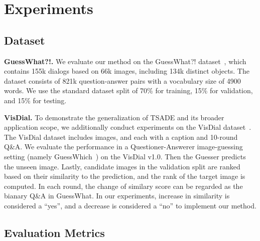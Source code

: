 

\section{Experiments}


\subsection{Dataset}

\textbf{GuessWhat?!.} We evaluate our method on the GuessWhat?! dataset~\cite{de2017guesswhat}, which contains 155k dialogs based on 66k images, including 134k distinct objects. The dataset consists of 821k question-answer pairs with a vocabulary size of 4900 words. We use the standard dataset split of 70\% for training, 15\% for validation, and 15\% for testing.

\textbf{VisDial.} To demonstrate the generalization of TSADE and its broader application scope, we additionally conduct experiments on the VisDial dataset~\cite{2017Visual}.
The VisDial dataset includes images, and each with a caption and 10-round Q\&A. We evaluate the performance in a Questioner-Answerer image-guessing setting (namely GuessWhich~\cite{das2017learning})  on the VisDial v1.0.
Then the Guesser predicts the unseen image. 
Lastly, candidate images in the validation split are ranked based on their similarity to the prediction, and the rank of the target image is computed.
In each round, the change of similary score can be regarded as the bianary Q\&A in GuessWhat. In our experiments, increase in similarity is considered a ``yes'', and a decrease is considered a ``no'' to implement our method.




\subsection{Evaluation Metrics}


